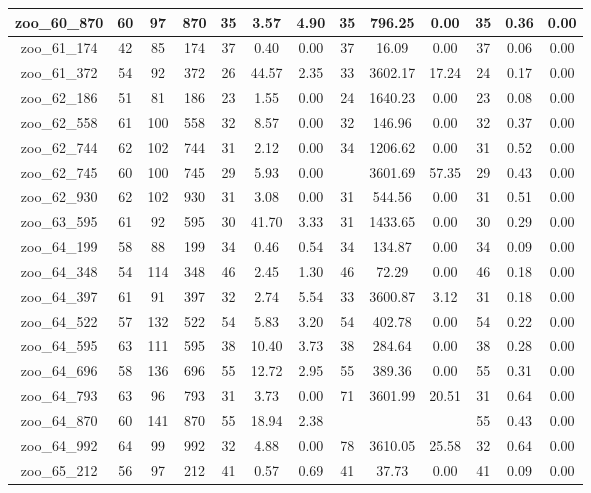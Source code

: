 \begin{landscape}
\begin{longtable}{|c|c|c|c|c|c|c|c|c|c|c|c|c|}
zoo\_60\_870 & 60 & 97 & 870 & 35 & 3.57 & 4.90 & 35 & 796.25 & 0.00 & 35 & 0.36 & 0.00 \\ \hline 
zoo\_61\_174 & 42 & 85 & 174 & 37 & 0.40 & 0.00 & 37 & 16.09 & 0.00 & 37 & 0.06 & 0.00 \\ \hline 
zoo\_61\_372 & 54 & 92 & 372 & 26 & 44.57 & 2.35 & 33 & 3602.17 & 17.24 & 24 & 0.17 & 0.00 \\ \hline 
zoo\_62\_186 & 51 & 81 & 186 & 23 & 1.55 & 0.00 & 24 & 1640.23 & 0.00 & 23 & 0.08 & 0.00 \\ \hline 
zoo\_62\_558 & 61 & 100 & 558 & 32 & 8.57 & 0.00 & 32 & 146.96 & 0.00 & 32 & 0.37 & 0.00 \\ \hline 
zoo\_62\_744 & 62 & 102 & 744 & 31 & 2.12 & 0.00 & 34 & 1206.62 & 0.00 & 31 & 0.52 & 0.00 \\ \hline 
zoo\_62\_745 & 60 & 100 & 745 & 29 & 5.93 & 0.00 &  & 3601.69 & 57.35 & 29 & 0.43 & 0.00 \\ \hline 
zoo\_62\_930 & 62 & 102 & 930 & 31 & 3.08 & 0.00 & 31 & 544.56 & 0.00 & 31 & 0.51 & 0.00 \\ \hline 
zoo\_63\_595 & 61 & 92 & 595 & 30 & 41.70 & 3.33 & 31 & 1433.65 & 0.00 & 30 & 0.29 & 0.00 \\ \hline 
zoo\_64\_199 & 58 & 88 & 199 & 34 & 0.46 & 0.54 & 34 & 134.87 & 0.00 & 34 & 0.09 & 0.00 \\ \hline 
zoo\_64\_348 & 54 & 114 & 348 & 46 & 2.45 & 1.30 & 46 & 72.29 & 0.00 & 46 & 0.18 & 0.00 \\ \hline 
zoo\_64\_397 & 61 & 91 & 397 & 32 & 2.74 & 5.54 & 33 & 3600.87 & 3.12 & 31 & 0.18 & 0.00 \\ \hline 
zoo\_64\_522 & 57 & 132 & 522 & 54 & 5.83 & 3.20 & 54 & 402.78 & 0.00 & 54 & 0.22 & 0.00 \\ \hline 
zoo\_64\_595 & 63 & 111 & 595 & 38 & 10.40 & 3.73 & 38 & 284.64 & 0.00 & 38 & 0.28 & 0.00 \\ \hline 
zoo\_64\_696 & 58 & 136 & 696 & 55 & 12.72 & 2.95 & 55 & 389.36 & 0.00 & 55 & 0.31 & 0.00 \\ \hline 
zoo\_64\_793 & 63 & 96 & 793 & 31 & 3.73 & 0.00 & 71 & 3601.99 & 20.51 & 31 & 0.64 & 0.00 \\ \hline 
zoo\_64\_870 & 60 & 141 & 870 & 55 & 18.94 & 2.38 &  &  &  & 55 & 0.43 & 0.00 \\ \hline 
zoo\_64\_992 & 64 & 99 & 992 & 32 & 4.88 & 0.00 & 78 & 3610.05 & 25.58 & 32 & 0.64 & 0.00 \\ \hline 
zoo\_65\_212 & 56 & 97 & 212 & 41 & 0.57 & 0.69 & 41 & 37.73 & 0.00 & 41 & 0.09 & 0.00 \\ \hline 

\end{longtable}
\end{landscape}
